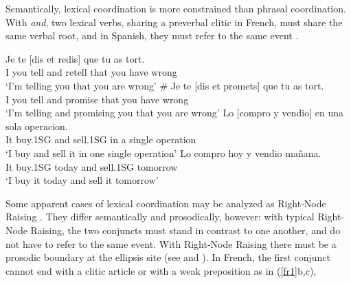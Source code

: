 \documentclass[output=paper]{langsci/langscibook}
\begin{document}
Semantically, lexical coordination is more constrained than phrasal coordination. With \textit{and}, two lexical verbs, sharing a preverbal clitic in French, must share the same verbal root, and in Spanish, they must refer to the same event \citep{Bosque:86}.

\begin{exe}
 \ex
\begin{xlista}
\ex \gll Je te [dis et redis] que tu as tort. \\
I you tell and retell that you have wrong\\
\glt `I'm telling you that you are wrong'
\ex \gll \# Je te [dis et promets] que tu as tort.\\
I you tell and promise that you have wrong\\
\glt `I'm telling and promising you that you are wrong'
\ex \gll Lo [compro y vendio] en una sola operacion.\\
It buy.1SG and sell.1SG in a single operation\\
\glt `I buy and sell it in one single operation'
\ex \gll *Lo compro hoy y vendio ma\~{n}ana.\\
It buy.1SG today and sell.1SG tomorrow \\
\glt `I buy it today and sell it tomorrow'
\end{xlista}
\end{exe}

Some apparent cases of lexical coordination may be analyzed as Right-Node Raising \citep{Beavers}. They differ semantically and prosodically, however: with typical Right-Node Raising, the two conjuncts must stand in contrast to one another, and do not have to refer to the same event. With Right-Node Raising there must be a prosodic boundary at the ellipsis site (see \citet{chavesrnr} and ). In French, the first conjunct cannot end with a clitic article or with a weak preposition as in (\ref{fr1}b,c),

\begin{exe}
 \ex
\begin{xlista}
\end{xlista}\label{fr1}
\end{exe}
\end{document}

